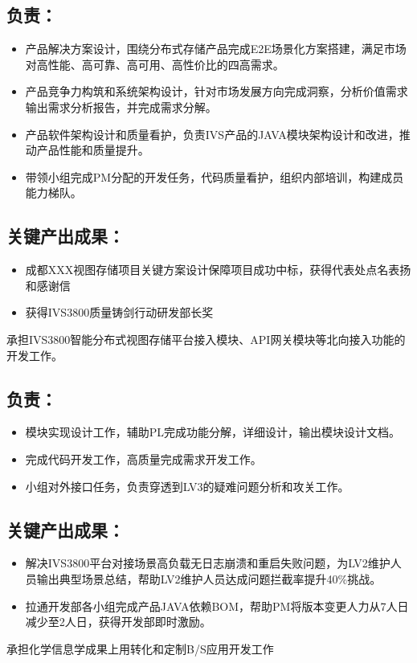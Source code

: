 \documentclass{resume}
\begin{document}
\subsection{\textbf{负责：}}
\begin{itemize}
  \item 产品解决方案设计，围绕分布式存储产品完成E2E场景化方案搭建，满足市场对高性能、高可靠、高可用、高性价比的四高需求。
  \item 产品竞争力构筑和系统架构设计，针对市场发展方向完成洞察，分析价值需求输出需求分析报告，并完成需求分解。
  \item 产品软件架构设计和质量看护，负责IVS产品的JAVA模块架构设计和改进，推动产品性能和质量提升。
  \item 带领小组完成PM分配的开发任务，代码质量看护，组织内部培训，构建成员能力梯队。
\end{itemize}
\subsection{\textbf{关键产出成果：}}
\begin{itemize}
  \item 成都XXX视图存储项目关键方案设计保障项目成功中标，获得代表处点名表扬和感谢信
  \item 获得IVS3800质量铸剑行动研发部长奖
\end{itemize}
\bigskip
{}
承担IVS3800智能分布式视图存储平台接入模块、API网关模块等北向接入功能的开发工作。
\subsection{\textbf{负责：}}
\begin{itemize}
  \item 模块实现设计工作，辅助PL完成功能分解，详细设计，输出模块设计文档。
  \item 完成代码开发工作，高质量完成需求开发工作。
  \item 小组对外接口任务，负责穿透到LV3的疑难问题分析和攻关工作。
\end{itemize}
\subsection{\textbf{关键产出成果：}}
\begin{itemize}
  \item 解决IVS3800平台对接场景高负载无日志崩溃和重启失败问题，为LV2维护人员输出典型场景总结，帮助LV2维护人员达成问题拦截率提升40\%挑战。
  \item 拉通开发部各小组完成产品JAVA依赖BOM，帮助PM将版本变更人力从7人日减少至2人日，获得开发部即时激励。
\end{itemize}
\bigskip
{}
承担化学信息学成果上用转化和定制B/S应用开发工作
\end{document}
